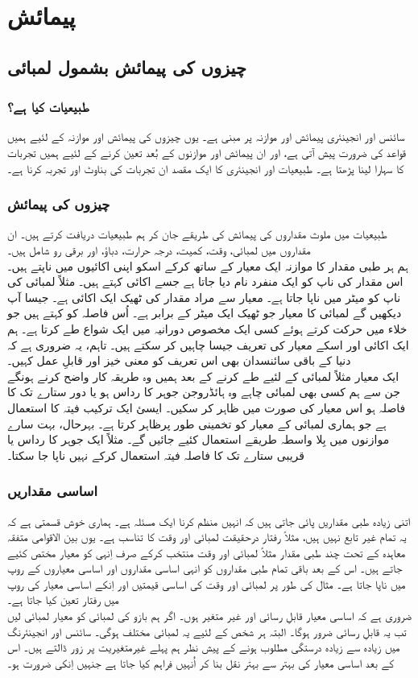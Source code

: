 \documentclass[leqno, b5paper]{khalid-urdu-book}
\begin{document}
	\chapter{پیمائش}
	\section{چیزوں کی پیمائش بشمول لمبائی}
	\subsection{طبیعیات کیا ہے؟}
	سائنس اور انجینئری پیمائش اور موازنہ پر مبنی ہے۔ یوں چیزوں کی پیمائش اور موازنہ کے لئیے ہمیں قواعد کی ضرورت پیش آتی ہے، اور ان پیمائش اور موازنوں کے بُعد تعین کرنے کے لئیے ہمیں تجربات کا سہارا لینا پڑھتا ہے۔ طبیعیات اور انجینئری کا ایک مقصد ان تجربات کی بناوٹ اور تجربہ کرنا ہے۔
	\subsection{چیزوں کی پیمائش}
	طبیعیات میں ملوث مقداروں کی پیمائش کی طریقے جان کر ہم طبیعیات دریافت کرتے ہیں۔ ان مقداروں میں لمبائی، وقت، کمیت، درجہ حرارت، دباؤ، اور برقی رو شامل ہیں۔\\ہم ہر طبی مقدار کا موازنہ ایک معیار کے ساتھ کرکے اسکو اپنی اکائیوں میں ناپتے ہیں۔ اس مقدار کی ناپ کو ایک منفرد نام دیا جاتا ہے جسے اکائی کہتے ہیں۔ مثلاً لمبائی کی ناپ کو میٹر میں ناپا جاتا ہے۔ معیار سے مراد مقدار کی ٹھیک ایک اکائی ہے۔ جیسا آپ دیکھیں گے لمبائی کا معیار جو ٹھیک ایک میٹر کے برابر ہے۔ اُس فاصلہ کو کہتے ہیں جو خلاء میں حرکت کرتے ہوئے کسی ایک مخصوص دورانیہ میں ایک شواع طے کرتا ہے۔ ہم ایک اکائی اور اسکے معیار کی تعریف جیسا چاہیں کر سکتے ہیں۔ تاہم، یہ ضروری ہے کہ دنیا کے باقی سائنسدان بھی اس تعریف کو معنی خیز اور قابلِ عمل کہیں۔\\ایک معیار مثلاً لمبائی کے لئیے طے کرنے کے بعد ہمیں وہ طریقہ کار واضح کرنے ہونگے جن سے ہم کسی بھی لمبائی چاہے وہ ہائڈروجن جوہر کا رداس ہو یا دور ستارے تک کا فاصلہ ہو اس معیار کی صورت میں ظاہر کر سکیں۔ ایسئ ایک ترکیب فیتہ کا استعمال ہے جو ہماری لمبائی کے معیار کو تخمینی طور پرظاہر کرتا ہے۔ بہرحال، بہت سارے موازنوں میں بِلا واسطہ طریقے استعمال کئیے جائیں گے۔ مثلاً ایک جوہر کا رداس یا قریبی ستارے تک کا فاصلہ فیتہ استعمال کرکے نہیں ناپا جا سکتا۔
	\subsection{اساسی مقداریں}
	اتنی زیادہ طبی مقداریں پائی جاتی ہیں کہ انہیں منظم کرنا ایک مسئلہ ہے۔ ہماری خوش قسمتی ہے کہ یہ تمام غیر تابع نہیں ہیں، مثلاً رفتار درحقیقت لمبائی اور وقت کا تناسب ہے۔ یوں بین الاقوامی متفقہ معاہدہ کے تحت چند طبی مقدار مثلاً لمبائی اور وقت منتخب کرکے صرف اِنہی کو معیار مختص کئیے جاتے ہیں۔ اس کے بعد باقی تمام طبی مقداروں کو انہی اساسی مقداروں اور اساسی معیاروں کے روپ میں ناپا جاتا ہے۔ مثال کی طور پر لمبائی اور وقت کی اساسی قیمتیں اور اِنکے اساسی معیار کی روپ میں رفتار تعین کیا جاتا ہے۔\\ ضروری ہے کہ اساسی معیار قابلِ رسائی اور غیر متغیر ہوں۔ اگر ہم بازو کی لمبائی کو معیار لمبائی لیں تب یہ قابلِ رسائی ضرور ہوگا۔ البتہ ہر شخص کے لئیے یہ لمبائی مختلف ہوگی۔ سائنس اور انجینئرنگ میں زیادہ سے زیادہ درستگی مطلوب ہونے کے پیش نظر ہم پہلے غیرمتغیریت پر زور ڈالتے ہیں۔ اس کے بعد اساسی معیار کی بہتر سے بہتر نقل بنا کر اُنہیں فراہم کیا جاتا ہے جنہیں اِنکی ضرورت ہو۔
\end{document}
